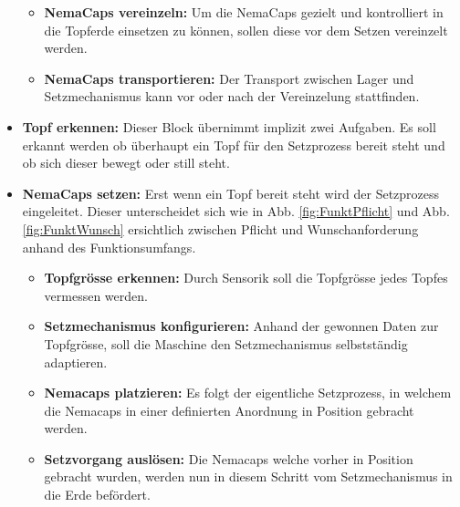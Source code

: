 \begin{itemize}
	\begin{itemize}
		\item \textbf{NemaCaps vereinzeln:} Um die NemaCaps gezielt und kontrolliert in die Topferde einsetzen zu können, sollen diese vor dem Setzen vereinzelt werden.
		
		\item \textbf{NemaCaps transportieren:} Der Transport zwischen Lager und Setzmechanismus kann vor oder nach der Vereinzelung stattfinden.
	\end{itemize}




	\item \textbf{Topf erkennen:} Dieser Block übernimmt implizit zwei Aufgaben. Es soll erkannt werden ob überhaupt ein Topf für den Setzprozess bereit steht und ob sich dieser bewegt oder still steht. 
	
	\item \textbf{NemaCaps setzen:} Erst wenn ein Topf bereit steht wird der Setzprozess eingeleitet. Dieser unterscheidet sich wie in Abb. \ref{fig:FunktPflicht} und Abb. \ref{fig:FunktWunsch} ersichtlich zwischen Pflicht und Wunschanforderung anhand des Funktionsumfangs.
	
	\begin{itemize}
		\item \textbf{Topfgrösse erkennen:} Durch Sensorik soll die Topfgrösse jedes Topfes vermessen werden.
		
		\item \textbf{Setzmechanismus konfigurieren:} Anhand der gewonnen Daten zur Topfgrösse, soll die Maschine den Setzmechanismus selbstständig adaptieren.
		
		\item \textbf{Nemacaps platzieren:} Es folgt der eigentliche Setzprozess, in welchem die Nemacaps in einer definierten Anordnung in Position gebracht werden.
		
		\item \textbf{Setzvorgang auslösen:} Die Nemacaps welche vorher in Position gebracht wurden, werden nun in diesem Schritt vom Setzmechanismus in die Erde befördert.
	\end{itemize}
	
\end{itemize}

